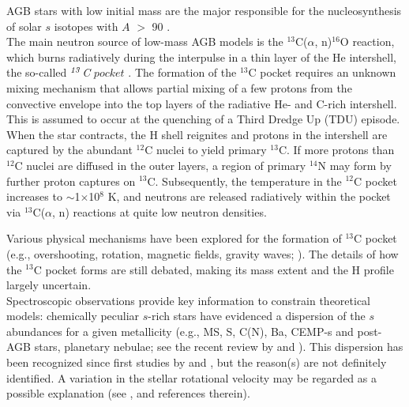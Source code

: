 \documentclass[manuscript]{aastex}
\begin{document}
AGB stars with low initial mass are the major responsible for the nucleosynthesis
of solar $s$ isotopes with $A$ $>$ 90 \citep{busso99}.
\\
The main neutron source of low-mass AGB models is the $^{13}$C($\alpha$, n)$^{16}$O reaction,
which burns radiatively during the interpulse in a thin layer of the He intershell, the 
so-called {\it $^{\it 13}$C} $pocket$ \citep{straniero95}. 
The formation of the $^{13}$C pocket requires an unknown mixing mechanism that allows
partial mixing of a few protons from the convective envelope into the top 
layers of the radiative He- and C-rich intershell. This is assumed to occur
at the quenching of a Third Dredge Up (TDU) episode.
When the star contracts, the H shell reignites and protons in the intershell 
are captured by the abundant $^{12}$C nuclei to yield primary $^{13}$C.
If more protons than $^{12}$C nuclei are diffused in the outer layers, a region of primary
$^{14}$N may form by further proton captures on $^{13}$C.
Subsequently, the temperature in the $^{12}$C pocket increases to
$\sim$1$\times$10$^8$ K, and neutrons are released radiatively within the pocket via 
$^{13}$C($\alpha$, n) reactions at 
quite low neutron densities.


Various physical mechanisms have been explored for the formation of $^{13}$C pocket
(e.g., overshooting, rotation, magnetic fields, gravity waves; 
\citealt{herwig97,langer99,denissenkov03,siess04,straniero06,piersanti13,nucci14}).
The details of how the $^{13}$C pocket forms are still debated, making its mass extent
and the H profile largely uncertain.
\\
Spectroscopic observations provide key information to constrain theoretical models:
chemically peculiar $s$-rich stars have evidenced a dispersion of the $s$ abundances
for a given metallicity (e.g., MS, S, C(N), Ba, CEMP-s and post-AGB stars, planetary 
nebulae; see the recent review by \citealt{kaeppeler11} and \citealt{karakas14}). 
This dispersion 
has been recognized since first studies by \citet{busso01} and \citet{abia02}, but
the reason(s) are not definitely identified.
A variation in the stellar rotational velocity may be regarded as a possible explanation 
(see \citealt{piersanti13}, and references therein).
\end{document}

